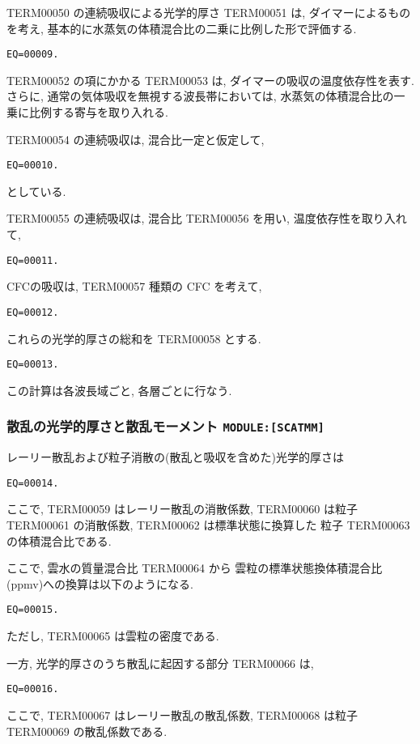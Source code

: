 TERM00050 の連続吸収による光学的厚さ TERM00051 は,
ダイマーによるものを考え, 
基本的に水蒸気の体積混合比の二乗に比例した形で評価する.
\begin{verbatim}
EQ=00009.
\end{verbatim}

TERM00052 の項にかかる TERM00053 は, 
ダイマーの吸収の温度依存性を表す.
さらに, 通常の気体吸収を無視する波長帯においては,
水蒸気の体積混合比の一乗に比例する寄与を取り入れる.

TERM00054 の連続吸収は, 混合比一定と仮定して,
\begin{verbatim}
EQ=00010.
\end{verbatim}
としている.

TERM00055 の連続吸収は, 混合比 TERM00056 を用い, 温度依存性を取り入れて,
\begin{verbatim}
EQ=00011.
\end{verbatim}

CFCの吸収は, TERM00057 種類の CFC を考えて,
\begin{verbatim}
EQ=00012.
\end{verbatim}

これらの光学的厚さの総和を TERM00058 とする.
\begin{verbatim}
EQ=00013.
\end{verbatim}

この計算は各波長域ごと, 各層ごとに行なう.

\subsubsection{散乱の光学的厚さと散乱モーメント \texttt{MODULE:[SCATMM]}}

レーリー散乱および粒子消散の(散乱と吸収を含めた)光学的厚さは
\begin{verbatim}
EQ=00014.
\end{verbatim}
ここで, TERM00059 はレーリー散乱の消散係数,
TERM00060 は粒子 TERM00061 の消散係数,
TERM00062 は標準状態に換算した
粒子 TERM00063 の体積混合比である.

ここで, 雲水の質量混合比 TERM00064 から
雲粒の標準状態換体積混合比(ppmv)への換算は以下のようになる.
\begin{verbatim}
EQ=00015.
\end{verbatim}
ただし, TERM00065 は雲粒の密度である.

一方, 光学的厚さのうち散乱に起因する部分 TERM00066 は,
\begin{verbatim}
EQ=00016.
\end{verbatim}
ここで, TERM00067 はレーリー散乱の散乱係数,
TERM00068 は粒子 TERM00069 の散乱係数である.

